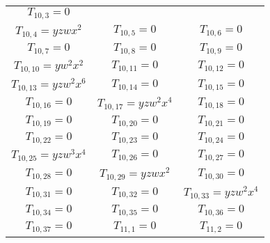 \documentclass[12pt]{memoireuqam1.3}
\begin{document}
\begin{longtable}{|c|c|c|}
$T_{10,3}= 0$\\

$T_{10,4}= yzwx^2$&

$T_{10,5}= 0$&

$T_{10,6}= 0$\\

$T_{10,7}= 0$&

$T_{10,8}= 0$&

$T_{10,9}= 0$\\

$T_{10,10}= yw^2x^2$&

$T_{10,11}= 0$&

$T_{10,12}= 0$\\

$T_{10,13}= yzw^2x^6$&

$T_{10,14}= 0$&

$T_{10,15}= 0$\\

$T_{10,16}= 0$&

$T_{10,17}= yzw^2x^4$&

$T_{10,18}= 0$\\

$T_{10,19}= 0$&

$T_{10,20}= 0$&

$T_{10,21}= 0$\\

$T_{10,22}= 0$&

$T_{10,23}= 0$&

$T_{10,24}= 0$\\

$T_{10,25}= yzw^3x^4$&

$T_{10,26}= 0$&

$T_{10,27}= 0$\\

$T_{10,28}= 0$&

$T_{10,29}= yzwx^2$&

$T_{10,30}= 0$\\

$T_{10,31}= 0$&

$T_{10,32}= 0$&

$T_{10,33}= yzw^2x^4$\\

$T_{10,34}= 0$&

$T_{10,35}= 0$&

$T_{10,36}= 0$\\

$T_{10,37}= 0$&

$T_{11,1}= 0$&

$T_{11,2}= 0$\\


\end{longtable}
\end{document}
